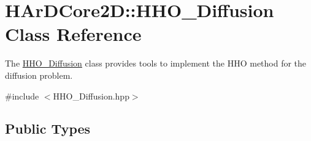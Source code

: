 \hypertarget{classHArDCore2D_1_1HHO__Diffusion}{}\section{H\+Ar\+D\+Core2D\+:\+:H\+H\+O\+\_\+\+Diffusion Class Reference}
\label{classHArDCore2D_1_1HHO__Diffusion}


The \hyperlink{classHArDCore2D_1_1HHO__Diffusion}{H\+H\+O\+\_\+\+Diffusion} class provides tools to implement the H\+HO method for the diffusion problem.  




{\ttfamily \#include $<$H\+H\+O\+\_\+\+Diffusion.\+hpp$>$}

\subsection*{Public Types}
